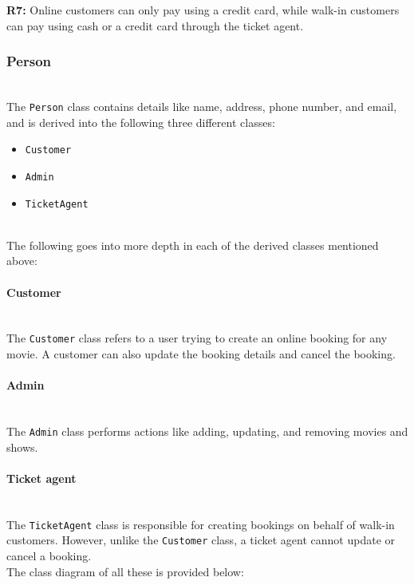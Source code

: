 \textbf{R7:} Online customers can only pay using a credit card, while walk-in customers can pay using cash or a credit card through the ticket agent.

\subsubsection{Person}\label{-pMf1PvJ8LPHHDgMy7s9T}
\\
The \texttt{Person} class contains details like name, address, phone number, and email, and is derived into the following three different classes:

\begin{itemize}
\item
\protect{}\label{MLPbH3j6CnlxCxdB2-R40}
\texttt{Customer}
\item
\protect{}\label{libVVq9E-kl2be-64tVj9}
\texttt{Admin}
\item
\protect{}\label{E7p2Sw2BSROCKFVKvVjWJ}
\texttt{TicketAgent}
\end{itemize}
\\
The following goes into more depth in each of the derived classes mentioned above:
\\
\paragraph{Customer}\label{kY1W-ZbmsBs3Ylo6kAKED}
\\
The \texttt{Customer} class refers to a user trying to create an online booking for any movie. A customer can also update the booking details and cancel the booking.
\\
\paragraph{Admin}\label{6yAqxrlexTkd2VfxUPd1y}
\\
The \texttt{Admin} class performs actions like adding, updating, and removing movies and shows.
\\
\paragraph{Ticket agent}\label{Rp1iU2L--rDx_8gc9zX-g}
\\
The \texttt{TicketAgent} class is responsible for creating bookings on behalf of walk-in customers. However, unlike the \texttt{Customer} class, a ticket agent cannot update or cancel a booking.
\\
The class diagram of all these is provided below:

